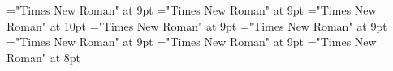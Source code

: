 \documentclass[gps1,twoside]{article}
\begin{document}
\font\spanspansensespanspansubentrysubentriesentrysubentriesdiventryletData="Times New Roman" at 9pt
\font\spanspanspansensespanspansubentrysubentriesentrysubentriesdiventryletData="Times New Roman" at 9pt
\font\spanenspanspanspansensespanspansubentrysubentriesentrysubentriesdiventryletData="Times New Roman" at 10pt
\font\spanabbreviationsemanticdomainsemanticdomainssensesensessensesensessubentrysubentriesentrylastchildafterspanspanspansensespanspansubentrysubentriesentrysubentriesdiventryletData="Times New Roman" at 9pt
\font\spannameacademicdomainacademicdomainssensesensessensesensessubentrysubentriesentryfirstchildbeforespanspanspansensespanspansubentrysubentriesentrysubentriesdiventryletData="Times New Roman" at 9pt
\font\spannameacademicdomainacademicdomainssensesensessensesensessubentrysubentriesentrylastchildafterspanspanspansensespanspansubentrysubentriesentrysubentriesdiventryletData="Times New Roman" at 9pt
\font\semanticdomainsemanticdomainsemanticdomainssensesensessensesensessubentrysubentriesentrybeforespansensespanspansubentrysubentriesentrysubentriesdiventryletData="Times New Roman" at 9pt
\font\exampleexampleexamplessensesensessensesensessubentrysubentriesentrybeforespansensespanspansubentrysubentriesentrysubentriesdiventryletData="Times New Roman" at 8pt
\end{document}
